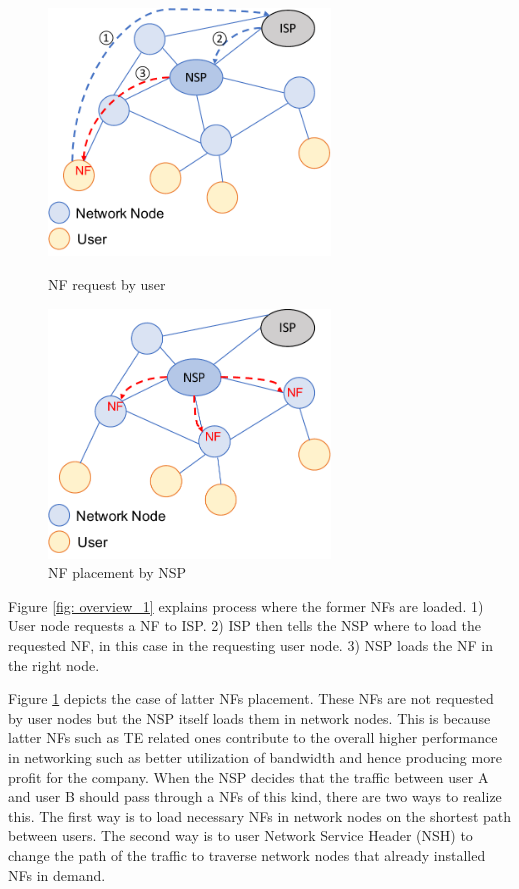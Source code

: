 \begin{figure}[t]
	\begin{minipage}{0.5\hsize}
		\begin{center}
			\includegraphics[width=75mm]{pics/overview_1.pdf}
		\end{center}
		\caption{NF request by user}
		\label{fig: overview_1}
	\end{minipage}	
	\begin{minipage}{0.5\hsize}
		\begin{center}
			\includegraphics[width=75mm]{pics/overview_2.pdf}
		\end{center}
		\caption{NF placement by NSP}
		\label{fig: overview_2}
	\end{minipage}	
\end{figure}

Figure \ref{fig: overview_1} explains process where the former NFs are loaded. 1) User node requests a NF to ISP. 2) ISP then tells the NSP where to load the requested NF, in this case in the requesting user node. 3) NSP loads the NF in the right node. 

Figure \ref{fig: overview_2} depicts the case of latter NFs placement. These NFs are not requested by user nodes but the NSP itself loads them in network nodes. This is because latter NFs such as TE related ones contribute to the overall higher performance in networking such as better utilization of bandwidth and hence producing more profit for the company. When the NSP decides that the traffic between user A and user B should pass through a NFs of this kind, there are two ways to realize this. The first way is to load necessary NFs in network nodes on the shortest path between users. The second way is to user Network Service Header (NSH\cite{NSH}) to change the path of the traffic to traverse network nodes that already installed NFs in demand. 

